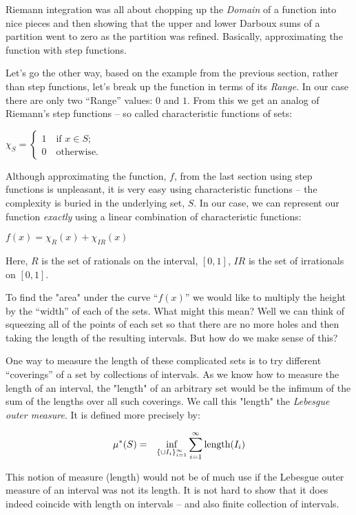 \documentclass{article}
\begin{document}
Riemann integration was all about chopping up the {\em Domain} of a function into nice 
pieces and then showing that the upper and lower Darboux sums of a partition 
went to zero as the partition was refined. Basically, approximating the function 
with step functions.

Let's go the other way, based on the example from the previous section, rather 
than step functions, let's break up the function in terms of its {\em Range}. 
In our case there are only two ``Range'' values: $0$ and $1$. From this we get an 
analog of Riemann's step functions -- 
so called characteristic functions of sets:

$\chi_{S} = \begin{cases} 1 \quad \text{if $x \in  S$;} \\ 0 \quad \text{otherwise.} \end{cases}$

Although approximating the function, $f$, from the last section using step 
functions is unpleasant, it is very easy using characteristic functions -- the complexity 
is buried in the underlying set, $S$. In our case, we can represent our function {\em exactly}
using a linear combination of characteristic functions:

$f(x) = \chi_{R}(x) + \chi_{IR}(x)$

Here, $R$ is the set of rationals on the interval, $[0,1]$, $IR$ is the set 
of irrationals on $[0, 1]$.

To find the "area" under the curve ``$f(x)$'' we would like to multiply the 
height by the ``width'' of each of the sets. What might this mean?
Well we can think of squeezing all of the points of each set so that there are 
no more holes and then taking the length of the resulting intervals.
But how do we make sense of this?

One way to measure the length of these complicated sets is to try different ``coverings'' 
of a set by collections of intervals.
As we know how to measure the length of an interval, the "length" of an arbitrary set 
would be the infimum of the sum of the lengths over all such coverings.
We call this "length" the {\em Lebesgue outer measure}. It is defined more precisely by:

\begin{eqnarray}
	\mu^*(S) & = & \inf_{\{\cup {I_i}\}_{i=1}^\infty} \sum_{i=1}^\infty {\rm length}(I_i)
\end{eqnarray}

This notion of measure (length) would not be of much use if the Lebesgue outer measure of
an interval was not its length.
It is not hard to show that it does indeed coincide with length on 
intervals -- and also finite collection of intervals.
\end{document}
